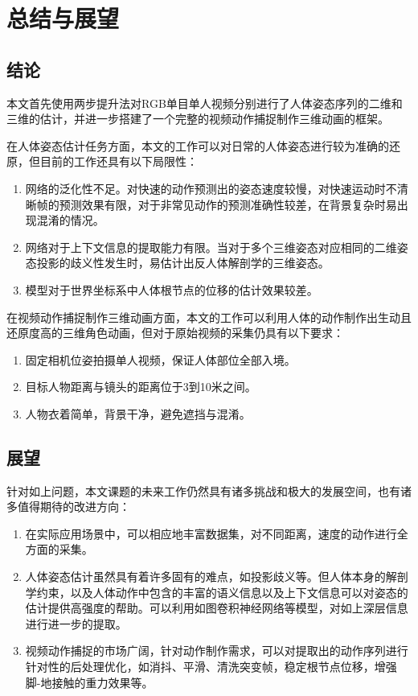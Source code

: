 
\chapter{总结与展望}

\section{结论}{}

本文首先使用两步提升法对RGB单目单人视频分别进行了人体姿态序列的二维和三维的估计，并进一步搭建了一个完整的视频动作捕捉制作三维动画的框架。


在人体姿态估计任务方面，本文的工作可以对日常的人体姿态进行较为准确的还原，但目前的工作还具有以下局限性：
\begin{enumerate}
    \item 网络的泛化性不足。对快速的动作预测出的姿态速度较慢，对快速运动时不清晰帧的预测效果有限，对于非常见动作的预测准确性较差，在背景复杂时易出现混淆的情况。
    \item 网络对于上下文信息的提取能力有限。当对于多个三维姿态对应相同的二维姿态投影的歧义性发生时，易估计出反人体解剖学的三维姿态。
    \item 模型对于世界坐标系中人体根节点的位移的估计效果较差。
\end{enumerate}

在视频动作捕捉制作三维动画方面，本文的工作可以利用人体的动作制作出生动且还原度高的三维角色动画，但对于原始视频的采集仍具有以下要求：
\begin{enumerate}
    \item 固定相机位姿拍摄单人视频，保证人体部位全部入境。
    \item 目标人物距离与镜头的距离位于3到10米之间。
    \item 人物衣着简单，背景干净，避免遮挡与混淆。
\end{enumerate}

\section{展望}{}
针对如上问题，本文课题的未来工作仍然具有诸多挑战和极大的发展空间，也有诸多值得期待的改进方向：
\begin{enumerate}
    \item 在实际应用场景中，可以相应地丰富数据集，对不同距离，速度的动作进行全方面的采集。
    \item 人体姿态估计虽然具有着许多固有的难点，如投影歧义等。但人体本身的解剖学约束，以及人体动作中包含的丰富的语义信息以及上下文信息可以对姿态的估计提供高强度的帮助。可以利用如图卷积神经网络等模型，对如上深层信息进行进一步的提取。
    \item 视频动作捕捉的市场广阔，针对动作制作需求，可以对提取出的动作序列进行针对性的后处理优化，如消抖、平滑、清洗突变帧，稳定根节点位移，增强脚-地接触的重力效果等。
\end{enumerate}



